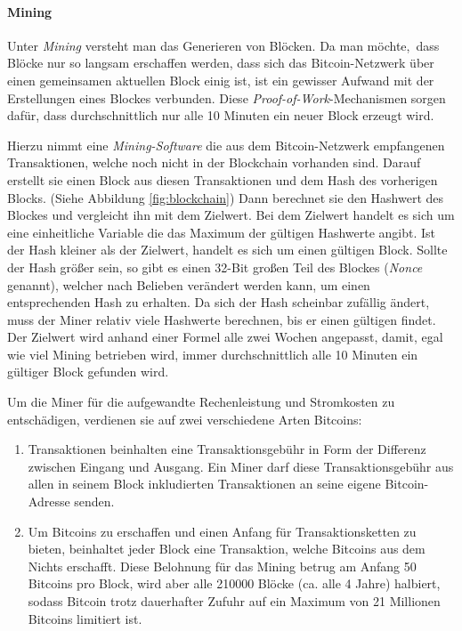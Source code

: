 \paragraph{Mining}
\label{subsec:mining}

Unter \emph{Mining} versteht man das Generieren von Blöcken.
Da man möchte, dass Blöcke nur so langsam erschaffen werden, dass sich das Bitcoin-Netzwerk über einen gemeinsamen aktuellen Block einig ist, ist ein gewisser Aufwand mit der Erstellungen eines Blockes verbunden.
Diese \emph{Proof-of-Work}-Mechanismen sorgen dafür, dass durchschnittlich nur alle 10 Minuten ein neuer Block erzeugt wird.

Hierzu nimmt eine \emph{Mining-Software} die aus dem Bitcoin-Netzwerk empfangenen Transaktionen, welche noch nicht in der Blockchain vorhanden sind.
Darauf erstellt sie einen Block aus diesen Transaktionen und dem Hash des vorherigen Blocks.
(Siehe Abbildung \ref{fig:blockchain})
Dann berechnet sie den Hashwert des Blockes und vergleicht ihn mit dem Zielwert.
Bei dem Zielwert handelt es sich um eine einheitliche Variable die das Maximum der gültigen Hashwerte angibt.
Ist der Hash kleiner als der Zielwert, handelt es sich um einen gültigen Block.
Sollte der Hash größer sein, so gibt es einen 32-Bit großen Teil des Blockes (\emph{Nonce} genannt), welcher nach Belieben verändert werden kann, um einen entsprechenden Hash zu erhalten.
Da sich der Hash scheinbar zufällig ändert, muss der Miner relativ viele Hashwerte berechnen, bis er einen gültigen findet.
Der Zielwert wird anhand einer Formel alle zwei Wochen angepasst, damit, egal wie viel Mining betrieben wird, immer durchschnittlich alle 10 Minuten ein gültiger Block gefunden wird.

Um die Miner für die aufgewandte Rechenleistung und Stromkosten zu entschädigen, verdienen sie auf zwei verschiedene Arten Bitcoins:
\begin{enumerate}
    \item Transaktionen beinhalten eine Transaktionsgebühr in Form der Differenz zwischen Eingang und Ausgang.
    Ein Miner darf diese Transaktionsgebühr aus allen in seinem Block inkludierten Transaktionen an seine eigene Bitcoin-Adresse senden.
    \item Um Bitcoins zu erschaffen und einen Anfang für Transaktionsketten zu bieten, beinhaltet jeder Block eine Transaktion, welche Bitcoins aus dem Nichts erschafft.
    Diese Belohnung für das Mining betrug am Anfang 50 Bitcoins pro Block, wird aber alle 210000 Blöcke (ca. alle 4 Jahre) halbiert, sodass Bitcoin trotz dauerhafter Zufuhr auf ein Maximum von 21 Millionen Bitcoins limitiert ist.
\end{enumerate}

